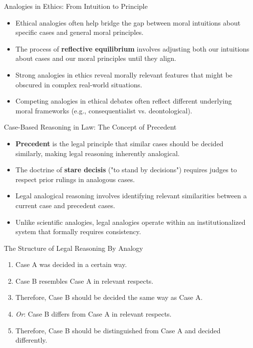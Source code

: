 \documentclass{beamer}
\begin{document}
	\begin{frame}{Analogies in Ethics: From Intuition to Principle}
		\begin{itemize}
			\item Ethical analogies often help bridge the gap between moral intuitions about specific cases and general moral principles.
			\item The process of \textbf{reflective equilibrium} involves adjusting both our intuitions about cases and our moral principles until they align.
			\item Strong analogies in ethics reveal morally relevant features that might be obscured in complex real-world situations.
			\item Competing analogies in ethical debates often reflect different underlying moral frameworks (e.g., consequentialist vs. deontological).
		\end{itemize}
		
	\end{frame}
	
	\begin{frame}{Case-Based Reasoning in Law: The Concept of Precedent}
		\begin{itemize}
			\item \textbf{Precedent} is the legal principle that similar cases should be decided similarly, making legal reasoning inherently analogical.
			\item The doctrine of \textbf{stare decisis} ("to stand by decisions") requires judges to respect prior rulings in analogous cases.
			\item Legal analogical reasoning involves identifying relevant similarities between a current case and precedent cases.
			\item Unlike scientific analogies, legal analogies operate within an institutionalized system that formally requires consistency.
		\end{itemize}
		
		\begin{exampleblock}{The Structure of Legal Reasoning By Analogy}
			\scriptsize
			\begin{enumerate}
				\item Case A was decided in a certain way.
				\item Case B resembles Case A in relevant respects.
				\item Therefore, Case B should be decided the same way as Case A.
				\item \textit{Or}: Case B differs from Case A in relevant respects.
				\item Therefore, Case B should be distinguished from Case A and decided differently.
			\end{enumerate}
		\end{exampleblock}
	\end{frame}
	
\end{document}

